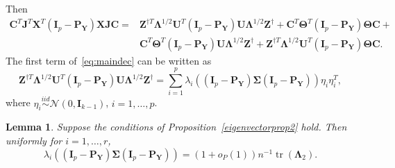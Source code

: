 \documentclass[12pt]{article} %
\DeclareMathOperator{\mytr}{tr}
\newcommand{\bZ}{\mathbf{Z}}
\newcommand{\bX}{\mathbf{X}}
\newcommand{\bP}{\mathbf{P}}
\newcommand{\bY}{\mathbf{Y}}
\newcommand{\bJ}{\mathbf{J}}
\newcommand{\bC}{\mathbf{C}}
\newcommand{\bI}{\mathbf{I}}
\newcommand{\bU}{\mathbf{U}}
\newcommand{\bfsym}[1]{\ensuremath{\boldsymbol{#1}}}
\def\bLambda {\bfsym {\Lambda}}
\def\bSigma {\bfsym {\Sigma}}
\def\bTheta {\bfsym {\Theta}}
\newtheorem{lemma}{Lemma}
\theoremstyle{definition}
\begin{document}
\begin{appendices}
Then 
\begin{equation}\label{eq:maindec}
\begin{aligned}
\bC^T\bJ^T \bX^T(\bI_p-\bP_{\bY}) \bX\bJ\bC
=&
\bZ^{\dagger T} \bLambda^{1/2}\bU^T (\bI_p-\bP_{\bY})\bU\bLambda^{1/2}\bZ^{\dagger}+
 \bC^T \bTheta^T (\bI_p -\bP_{\bY})\bTheta \bC+\\
 & \bC^T \bTheta^T (\bI_p -\bP_{\bY})\bU\bLambda^{1/2}\bZ^{\dagger}+
 \bZ^{\dagger T} \bLambda^{1/2}\bU^T (\bI_p-\bP_{\bY})\bTheta \bC.
\end{aligned}
\end{equation}
    The first term of~\eqref{eq:maindec} can be written as
\begin{equation}\label{eq:firstTerm}
    \bZ^{\dagger T} \bLambda^{1/2}\bU^T (\bI_p-\bP_{\bY})\bU\bLambda^{1/2}\bZ^{\dagger}=
\sum_{i=1}^p \lambda_i ( (\bI_p-\bP_{\bY})\bSigma (\bI_p-\bP_{\bY}))\eta_i \eta_i^T,
\end{equation}
where $\eta_i\overset{iid}{\sim} \mathcal{N}(0,\bI_{k-1})$, $i=1,\ldots,p$.







\begin{lemma}\label{gg:Lemma1}
    Suppose the conditions of Proposition~\ref{eigenvectorprop2} hold.
    Then uniformly for $i=1,\ldots, r$,
\begin{equation*}
    \lambda_i\left(
             (\bI_p -\bP_\bY)\bSigma (\bI_p- \bP_{\bY})
         \right)
         =(1+o_P(1))n^{-1}\mytr(\bLambda_2).
\end{equation*}


\end{lemma}
\end{appendices}
\end{document}
